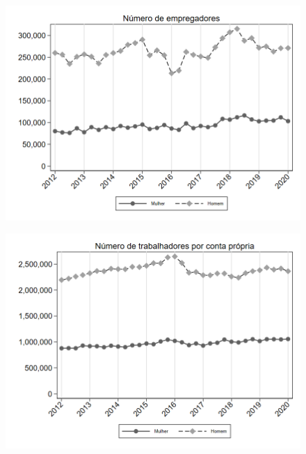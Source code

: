 \begin{frame}[label=_composicao_demografica_genero_n_empregador]{}
\textit{\hyperlink{_composicao_demografica_genero}{}}
\begin{figure}
  \centering
  \includegraphics[width=1.0\linewidth]{../../analysis/output/composicao_demografica/genero/_composicao_demografica_genero_n_empregador.png}
  \caption{}
  \label{fig:_composicao_demografica_genero_n_empregador}
\end{figure}
\end{frame}



\begin{frame}[label=_composicao_demografica_genero_n_cpropria]{}
\textit{\hyperlink{_composicao_demografica_genero}{}}
\begin{figure}
  \centering
  \includegraphics[width=1.0\linewidth]{../../analysis/output/composicao_demografica/genero/_composicao_demografica_genero_n_cpropria.png}
  \caption{}
  \label{fig:_composicao_demografica_genero_n_cpropria}
\end{figure}
\end{frame}

